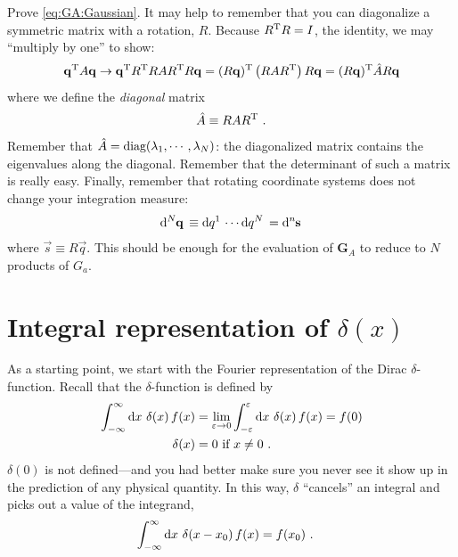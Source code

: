 \documentclass[12pt, oneside]{report}    %
\let\oldsection\section
\def\section{%
  \setcounter{sidenote}{1}%
  \oldsection
}
\begin{document}
\begin{exercise}
Prove \eqref{eq:GA:Gaussian}.
It may help to remember that you can diagonalize a symmetric matrix with a rotation, $R$. Because $R^\textnormal{T} R = I$, the identity, we may ``multiply by one'' to show:
\begin{align}
    \vec{q}^\textnormal{T} A \vec{q} \to 
    \vec{q}^\textnormal{T} R^\textnormal{T} R A R^\textnormal{T} R \vec{q}
    =
    (R \vec{q})^\textnormal{T} \left(R A R^\textnormal{T}\right) R \vec{q}
    =
    (R \vec{q})^\textnormal{T} \hat A R \vec{q}
\end{align}
where we define the \emph{diagonal} matrix
\begin{align}
    \hat A \equiv R A R^\textnormal{T} \ .
\end{align}
Remember that $\hat A = \textnormal{diag}(\lambda_1, \cdots, \lambda_N)$: the diagonalized matrix contains the eigenvalues along the diagonal. Remember that the determinant of such a matrix is really easy. Finally, remember that rotating coordinate systems does not change your integration measure:
\begin{align}
    \D[N]{\vec{q}} \equiv \D{q^1}\cdots \D{q^N} = \D[n]{\vec{s}}
\end{align}
where $\vec{s}\equiv R\vec{q}$. This should be enough for the evaluation of $\mathbf{G}_A$ to reduce to $N$ products of $G_a$.
\end{exercise}


\section{\texorpdfstring{Integral representation of $\delta(x)$}{Integral representation of delta}}

As a starting point, we start with the Fourier representation of the Dirac $\delta$-function. Recall that the $\delta$-function is defined by
\begin{align}
    \int_{-\infty}^\infty \D{x}\, \delta(x)\,f(x) &= 
    \lim_{\varepsilon \to 0}\int_{-\varepsilon}^\varepsilon \D{x}\, \delta(x)\,f(x) = f(0)
    \\
    \delta(x) &= 0 \text{ if $x\neq 0$} \ .
\end{align}
$\delta(0)$ is not defined---and you had better make sure you never see it show up in the prediction of any physical quantity. In this way, $\delta$ ``cancels'' an integral and picks out a value of the integrand,
\begin{align}
    \int_{-\infty}^\infty \D{x} \, \delta(x-x_0)\, f(x) &= f(x_0) \ .
\end{align}
\end{document}
